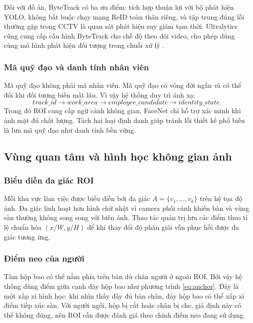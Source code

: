 Đối với đồ án, ByteTrack có ba ưu điểm: tích hợp thuận lợi với bộ phát hiện YOLO, không bắt buộc chạy mạng ReID toàn thân riêng, và tập trung đúng lỗi thường gặp trong CCTV là quan sát phát hiện suy giảm tạm thời. Ultralytics cũng cung cấp cấu hình ByteTrack cho chế độ theo dõi video, cho phép dùng cùng mô hình phát hiện đối tượng trong chuỗi xử lý \cite{ultralyticstrack}.

\subsubsection{Mã quỹ đạo và danh tính nhân viên}
Mã quỹ đạo không phải mã nhân viên. Mã quỹ đạo có vòng đời ngắn và có thể đổi khi đối tượng biến mất lâu. Vì vậy hệ thống duy trì ánh xạ:
\begin{equation}
 track\_id \rightarrow work\_area \rightarrow employee\_candidate \rightarrow identity\_state.
\end{equation}
Trong đó ROI cung cấp ngữ cảnh không gian, FaceNet chỉ hỗ trợ xác minh khi ảnh mặt đủ chất lượng. Tách hai loại định danh giúp tránh lỗi thiết kế phổ biến là lưu mã quỹ đạo như danh tính bền vững.

\subsection{Vùng quan tâm và hình học không gian ảnh}
\subsubsection{Biểu diễn đa giác ROI}
Mỗi khu vực làm việc được biểu diễn bởi đa giác $A=\{v_1,\ldots,v_k\}$ trên hệ tọa độ ảnh. Đa giác linh hoạt hơn hình chữ nhật vì camera phối cảnh khiến bàn và vùng sàn thường không song song với biên ảnh. Thao tác quản trị lưu các điểm theo tỉ lệ chuẩn hóa $(x/W,y/H)$ để khi thay đổi độ phân giải vẫn phục hồi được đa giác tương ứng.

\subsubsection{Điểm neo của người}
Tâm hộp bao có thể nằm phía trên bàn dù chân người ở ngoài ROI. Bởi vậy hệ thống dùng điểm giữa cạnh đáy hộp bao như phương trình \ref{eq:anchor}. Đây là một xấp xỉ hình học: khi nhìn thấy đầy đủ bàn chân, đáy hộp bao có thể xấp xỉ điểm tiếp xúc sàn. Với người ngồi, hộp bị cắt hoặc chân bị che, giả định này có thể không đúng, nên ROI cần được đánh giá theo chính điểm neo đang sử dụng.

